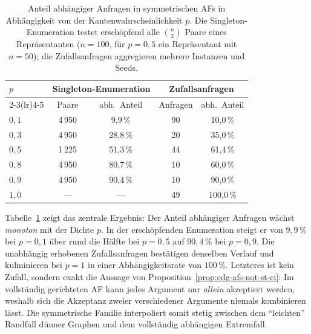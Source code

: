 \begin{table}[htbp]
    \myfloatalign
    \begin{tabularx}{\textwidth}{Xcccc} \toprule
        \(p\) & \multicolumn{2}{c}{Singleton-Enumeration} &
                \multicolumn{2}{c}{Zufallsanfragen} \\
        \cmidrule(lr){2-3}\cmidrule(lr){4-5}
              & Paare & abh.\ Anteil & Anfragen & abh.\ Anteil \\ \midrule
        \(0{,}1\) & 4\,950 & 9{,}9\,\%  & 90 & 10{,}0\,\% \\
        \(0{,}3\) & 4\,950 & 28{,}8\,\% & 20 & 35{,}0\,\% \\
        \(0{,}5\) & 1\,225 & 51{,}3\,\% & 44 & 61{,}4\,\% \\
        \(0{,}8\) & 4\,950 & 80{,}7\,\% & 10 & 60{,}0\,\% \\
        \(0{,}9\) & 4\,950 & 90{,}4\,\% & 10 & 90{,}0\,\% \\
        \(1{,}0\) & ---    & ---        & 49 & 100{,}0\,\% \\
        \bottomrule
    \end{tabularx}
    \caption[Abh\"angigkeitsrate symmetrischer AFs nach Dichte]{Anteil
    abh\"angiger Anfragen in symmetrischen AFs in Abh\"angigkeit von der
    Kantenwahrscheinlichkeit \(p\). Die Singleton-Enumeration testet
    ersch\"opfend alle \(\binom{n}{2}\) Paare eines Repr\"asentanten (\(n=100\),
    f\"ur \(p=0{,}5\) ein Repr\"asentant mit \(n=50\)); die Zufallsanfragen
    aggregieren mehrere Instanzen und Seeds.}
    \label{tab:gce-sym}
\end{table}

Tabelle~\ref{tab:gce-sym} zeigt das zentrale Ergebnis: Der Anteil abh\"angiger
Anfragen w\"achst \emph{monoton} mit der Dichte \(p\). In der ersch\"opfenden
Enumeration steigt er von \(9{,}9\,\%\) bei \(p=0{,}1\) \"uber rund die H\"alfte
bei \(p=0{,}5\) auf \(90{,}4\,\%\) bei \(p=0{,}9\). Die unabh\"angig erhobenen
Zufallsanfragen best\"atigen denselben Verlauf und kulminieren bei \(p=1\) in
einer Abh\"angigkeitsrate von \(100\,\%\). Letzteres ist kein Zufall, sondern
exakt die Aussage von Proposition~\ref{prop:cdg-afs-not-st-ci}: Im
vollst\"andig gerichteten AF kann jedes Argument nur \emph{allein}
akzeptiert werden, weshalb sich die Akzeptanz zweier verschiedener Argumente
niemals kombinieren l\"asst. Die symmetrische Familie interpoliert somit
stetig zwischen dem \enquote{leichten} Randfall d\"unner Graphen und dem
vollst\"andig abh\"angigen Extremfall.

